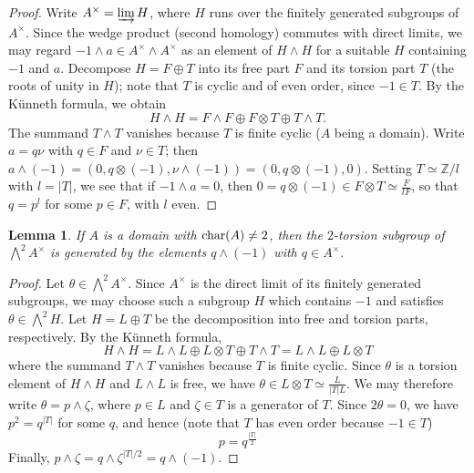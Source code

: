 \documentclass[11pt]{amsart}
\theoremstyle{definition}
\theoremstyle{plain}
\newtheorem{lem}[ntn]{Lemma}
\theoremstyle{definition}
\numberwithin{equation}{section}
\newcommand{\z}{\mathbb{Z}}
\renewcommand{\aa}{{A^\times}}
\newcommand{\lan}{\langle}
\newcommand{\ran}{\rangle}
\renewcommand{\char}{{\rm char}}
\begin{document}
	\begin{proof}
		Write $\aa=\varinjlim H$, where $H$ runs over the finitely generated subgroups of $\aa$. Since the wedge product (second homology) commutes with direct limits, we may regard $-1\wedge a\in \aa\wedge \aa$ as an element of $H\wedge H$ for a suitable $H$ containing $-1$ and $a$. Decompose $H=F\oplus T$ into its free part $F$ and its torsion part $T$ (the roots of unity in $H$); note that $T$ is cyclic and of even order, since $-1\in T$. By the K\"unneth formula, we obtain
		\[
		H\wedge H=F\wedge F\oplus F\otimes T\oplus T\wedge T.
		\]
		The summand $T\wedge T$ vanishes because $T$ is finite cyclic ($A$ being a domain). Write $a=q\nu$ with $q\in F$ and $\nu\in T$; then $a\wedge (-1)=(0,q\otimes(-1),\nu\wedge (-1))=(0,q\otimes(-1),0)$. Setting $T\simeq \z/l$ with $l=|T|$, we see that if $-1\wedge a=0$, then $\displaystyle 0=q\otimes(-1)\in F\otimes T\simeq\frac{F}{lF}$, so that $q=p^l$ for some $p\in F$, with $l$ even. %
	\end{proof}
	\begin{lem}
		\label{ker-wed-2}
		If $A$ is a domain with $\char(A)\neq 2$, then the $2$-torsion subgroup of $\bigwedge^2\aa$ is generated by the elements $q\wedge (-1)$ with $q\in\aa$.
	\end{lem}
	\begin{proof}
		Let $\theta\in\bigwedge^2\aa$. Since $\aa$ is the direct limit of its finitely generated subgroups, we may choose such a subgroup $H$ which contains $-1$ and satisfies $\theta\in\bigwedge^2H$. Let $H=L\oplus T$ be the decomposition into free and torsion parts, respectively. By the K\"unneth formula,
		\[
		H\wedge H=L\wedge L\oplus L\otimes T\oplus T\wedge T=L\wedge L\oplus L\otimes T
		\]
		where the summand $T\wedge T$ vanishes because $T$ is finite cyclic. Since $\theta$ is a torsion element of $H\wedge H$ and $L\wedge L$ is free, we have $\displaystyle\theta\in L\otimes T\simeq \frac{L}{|T|L}$. We may therefore write $\theta=p\wedge\zeta$, where $p\in L$ and $\zeta\in T$ is a generator of $T$. Since $2\theta=0$, we have $p^2=q^{|T|}$ for some $q$, and hence (note that $T$ has even order because $-1\in T$)
		\[
		p=q^{\frac{|T|}{2}}
		\]
		Finally, $p\wedge\zeta=q\wedge\zeta^{|T|/2}=q\wedge(-1)$.
	\end{proof}
\end{document}
